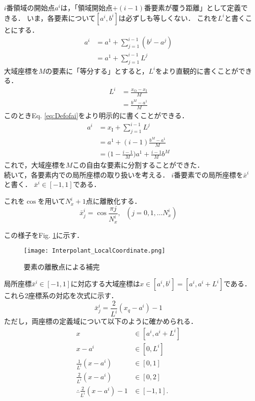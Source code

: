 \documentclass[12pt,a4paper]{jsarticle}
\begin{document}
$i$番領域の開始点$a^i$は，「領域開始点$+(i-1)$番要素が覆う距離」として定義できる．
いま，各要素について$[a^i, b^i]$は必ずしも等しくない．
これを$L^i$と書くことにする．
\begin{align}
  a^i &= a^1 +\sum_{j=1}^{i-1} (b^j -a^j) \nonumber \\
      &= a^1 +\sum_{j=1}^{i-1} L^j
  \label{eq:Defofai}
\end{align}
大域座標を$M$の要素に「等分する」とすると，$L^i$をより直観的に書くことができる．
\begin{align}
  L^i &= \frac{x_{\text{O}} -x_{\text{I}}}{M} \nonumber \\
      &= \frac{b^M -a^1}{M}
  \label{eq:DefofLi}
\end{align}
このときEq. \ref{eq:Defofai}をより明示的に書くことができる．
\begin{align}
  a^i &= x_{\text{I}} +\sum_{j=1}^{i-1} L^j \nonumber \\
      &= a^1 +(i-1) \frac{b^M -a^1}{M} \nonumber \\
      &= \Big( 1-\frac{i-1}{M} \Big) a^1 +\frac{i-1}{M} b^M
  \label{eq:Defofai_equally}
\end{align}
これで，大域座標を$M$この自由な要素に分割することができた．\\

続いて，各要素内での局所座標の取り扱いを考える．
$i$番要素での局所座標を$\bar{x}^i$と書く．
$\bar{x}^i \in [-1,1]$である．

これを$\cos$を用いて$N_{x}^i+1$点に離散化する．
\begin{equation}
  \bar{x}_{j}^i = \cos \frac{\pi j}{N_{x}^i}, ~~~(j = 0, 1, \dots N_{x}^i)
  \label{eq:InterpolantofLocalCoordinate}
\end{equation}

この様子をFig. \ref{fig:Interpolant_LocalCoordinate}に示す．
\begin{figure}[h]
  \centering
  \texttt{[image: Interpolant\_LocalCoordinate.png]}
  \caption{要素の離散点による補完}
  \label{fig:Interpolant_LocalCoordinate}
\end{figure}

局所座標$\bar{x}^i \in [-1,1]$に対応する大域座標は$x \in [a^i, b^i] = [a^i, a^i+L^i]$である．
これら2座標系の対応を次式に示す．
\begin{equation}
  \bar{x}_{j}^i = \frac{2}{L^i} (x_{q}-a^i) -1
  \label{eq:ConnectLocalGlobalCoordinate}
\end{equation}
ただし，両座標の定義域について以下のように確かめられる．
\begin{align*}
  x &\in [a^i, a^i+L^i] \\
  x-a^i &\in [0, L^i] \\
  \frac{1}{L^i} (x-a^i) &\in [0,1] \\
  \frac{2}{L^i} (x-a^i) &\in [0,2] \\
  \therefore \frac{2}{L^i} (x-a^i)-1 &\in [-1,1].
\end{align*}\\
\end{document}
